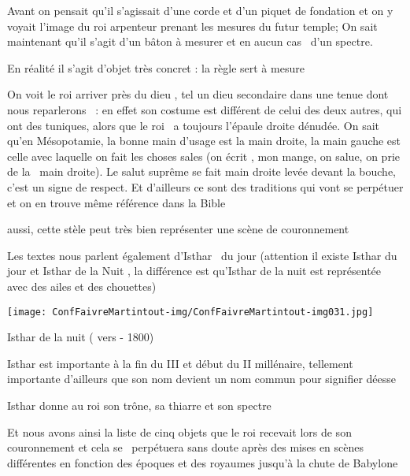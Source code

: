 \documentclass[a4paper]{article}
\begin{document}
{
Avant on pensait qu'il s'agissait d'une corde et d'un piquet de
fondation et on y voyait l'image du roi arpenteur prenant les mesures
du futur temple; On sait maintenant qu'il s'agit d'un bâton à mesurer
et en aucun cas \ d'un spectre.}

{
En réalité il s'agit d'objet très concret : la règle sert à mesure}

{
On voit le roi arriver près du dieu , tel un dieu secondaire dans une
tenue dont nous reparlerons \ : en effet son costume est différent de
celui des deux autres, qui ont des tuniques, alors que le roi \ a
toujours l'épaule droite dénudée. On sait qu'en Mésopotamie, la bonne
main d'usage est la main droite, la main gauche est celle avec laquelle
on fait les choses sales (on écrit , mon mange, on salue, on prie de la
\ main droite). Le salut suprême se fait main droite levée devant la
bouche, c'est un signe de respect. Et d'ailleurs ce sont des traditions
qui vont se perpétuer et on en trouve même référence dans la Bible}

{
aussi, cette stèle peut très bien représenter une scène de couronnement}


\bigskip

{
Les textes nous parlent également d'Isthar \ du jour (attention il
existe Isthar du jour et Isthar de la Nuit , la différence est
qu'Isthar de la nuit est représentée avec des ailes et des chouettes)}


\bigskip


\texttt{[image: ConfFaivreMartintout-img/ConfFaivreMartintout-img031.jpg]}



\bigskip

{
Isthar de la nuit ( vers - 1800)\ \ }


\bigskip

{
Isthar est importante à la fin du III et début du II millénaire,
tellement importante d'ailleurs que son nom devient un nom commun pour
signifier déesse}

{
Isthar donne au roi son trône, sa thiarre et son spectre }


\bigskip

{
Et nous avons ainsi la liste de cinq objets que le roi recevait lors de
son couronnement et cela se \ perpétuera sans doute après des mises en
scènes différentes en fonction des époques et des royaumes jusqu'à la
chute de Babylone}
\end{document}
